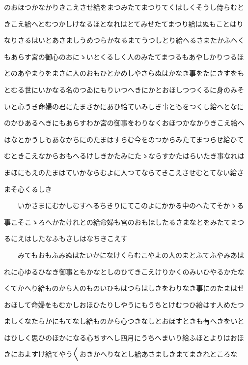 \documentclass[a4paper,11pt,landscape]{ltjtarticle}
\begin{document}
のおほつかなかりきこえさせ給をまつみたてまつりてくはしくそうし侍らむと
\par\medskip
きこえ給へとむつかしけなるほとなれはとてみせたてまつり給はぬもことはり
\par\medskip
なりさるはいとあさましうめつらかなるまてうつしとり給へるさまたかふへく
\par\medskip
もあらす宮の御心のおにゝいとくるしく人のみたてまつるもあやしかりつるほ
\par\medskip
とのあやまりをまさに人のおもひとかめしやさらぬはかなき事をたにきすをも
\par\medskip
とむる世にいかなる名のつゐにもりいつへきにかとおほしつつくるに身のみそ
\par\medskip
いと心うき命婦の君にたまさかにあひ給ていみしき事ともをつくし給へとなに
\par\medskip
のかひあるへきにもあらすわか宮の御事をわりなくおほつかなかりきこえ給へ
\par\medskip
はなとかうしもあなかちにのたまはすらむ今をのつからみたてまつらせ給ひて
\par\medskip
むときこえなからおもへるけしきかたみにたゝならすかたはらいたき事なれは
\par\medskip
まほにもえのたまはていかならむよに人つてならてきこえさせむとてない給さ
\par\medskip
まそ心くるしき
\par\medskip
　　いかさまにむかしむすへるちきりにてこのよにかかる中のへたてそかゝる
\par\medskip
事こそこゝろへかたけれとの給命婦も宮のおもほしたるさまなとをみたてまつ
\par\medskip
るにえはしたなふもさしはなちきこえす
\par\medskip
　　みてもおもふみぬはたいかになけくらむこやよの人のまとふてふやみあは
\par\medskip
れに心ゆるひなき御事ともかなとしのひてきこえけりかくのみいひやるかたな
\par\medskip
くてかへり給ものから人のものいひもはつらはしきをわりなき事にのたまはせ
\par\medskip
おほして命婦をもむかしおほひたりしやうにもうちとけむつひ給はす人めたつ
\par\medskip
ましくなたらかにもてなし給ものから心つきなしとおほすときも有へきをいと
\par\medskip
はひしく思ひのほかになる心ちすへし四月にうちへまいり給ふほとよりはおほ
\par\medskip
きにおよすけ給てやう〱おきかへりなとし給あさましきまてまきれところな
\par\medskip
\end{document}
